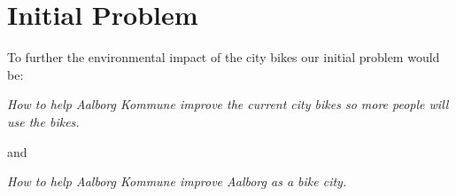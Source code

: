 \section*{Initial Problem}
To further the environmental impact of the city bikes our initial problem would be:

\textit{How to help Aalborg Kommune improve the current city bikes so more people will use the bikes.}
\begin{center}
and
\end{center}
\textit{How to help Aalborg Kommune improve Aalborg as a bike city.}

